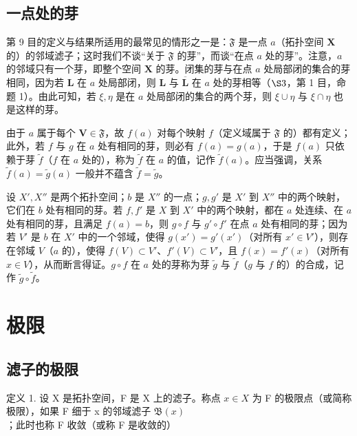 \subsection{一点处的芽}

第 9 目的定义与结果所适用的最常见的情形之一是：\(\mathfrak{F}\) 是一点 \(a\)（拓扑空间 \(\mathbf{X}\) 的）的邻域滤子；这时我们不谈“关于 \(\mathfrak{F}\) 的芽”，而谈“在点 \(a\) 处的芽”。注意，\(a\) 的邻域只有一个芽，即整个空间 \(\mathbf{X}\) 的芽。闭集的芽与在点 \(a\) 处局部闭的集合的芽相同，因为若 \(\mathbf{L}\) 在 \(a\) 处局部闭，则 \(\mathbf{L}\) 与 \(\overline{\mathbf{L}}\) 在 \(a\) 处的芽相等（\(\S 3\)，第 1 目，命题 1）。由此可知，若 \(\xi, \eta\) 是在 \(a\) 处局部闭的集合的两个芽，则 \(\xi \cup \eta\) 与 \(\xi \cap \eta\) 也是这样的芽。

由于 \(a\) 属于每个 \(\mathbf{V} \in \mathfrak{F}\)，故 \(f(a)\) 对每个映射 \(f\)（定义域属于 \(\mathfrak{F}\) 的）都有定义；此外，若 \(f\) 与 \(g\) 在 \(a\) 处有相同的芽，则必有 \(f(a) = g(a)\)，于是 \(f(a)\) 只依赖于芽 \(\tilde{f}\)（\(f\) 在 \(a\) 处的），称为 \(\tilde{f}\) 在 \(a\) 的值，记作 \(\tilde{f}(a)\)。应当强调，关系 \(\tilde{f}(a) = \tilde{g}(a)\) 一般并不蕴含 \(\tilde{f} = \tilde{g}\)。

设 \(X', X''\) 是两个拓扑空间；\(b\) 是 \(X''\) 的一点；\(g, g'\) 是 \(X'\) 到 \(X''\) 中的两个映射，它们在 \(b\) 处有相同的芽。若 \(f, f'\) 是 \(X\) 到 \(X'\) 中的两个映射，都在 \(a\) 处连续、在 \(a\) 处有相同的芽，且满足 \(f(a) = b\)，则 \(g \circ f\) 与 \(g' \circ f'\) 在点 \(a\) 处有相同的芽；因为若 \(V'\) 是 \(b\) 在 \(X'\) 中的一个邻域，使得 \(g(x') = g'(x')\)（对所有 \(x' \in V'\)），则存在邻域 \(V\)（\(a\) 的），使得 \(f(V) \subset V'\)、\(f'(V) \subset V'\)，且 \(f(x) = f'(x)\)（对所有 \(x \in V\)），从而断言得证。\(g \circ f\) 在 \(a\) 处的芽称为芽 \(\tilde{g}\) 与 \(\tilde{f}\)（\(g\) 与 \(f\) 的）的合成，记作 \(\tilde{g} \circ \tilde{f}\)。

\section{极限}

\subsection{滤子的极限}

定义 1. 设 X 是拓扑空间，F 是 X 上的滤子。称点 \(x \in X\) 为 F 的极限点（或简称极限），如果 F 细于 x 的邻域滤子 \(\mathfrak{B}(x)\)；此时也称 F 收敛（或称 F 是收敛的）

